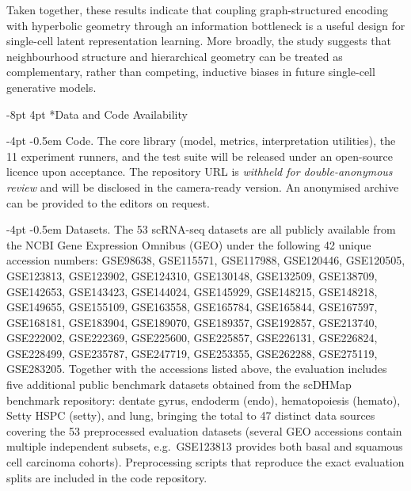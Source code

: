 \documentclass[preprint,12pt]{elsarticle}
\makeatletter
\renewcommand\section{\@startsection{section}{1}{\z@}%
  {-8pt \@plus -2pt \@minus -2pt}%
  {4pt \@plus 1pt \@minus 1pt}%
  {\normalfont\Large\bfseries}}
\renewcommand\paragraph{\@startsection{paragraph}{4}{\z@}%
  {-4pt \@plus -1pt \@minus -1pt}%
  {-0.5em}%
  {\normalfont\normalsize\bfseries}}
\makeatother
\begin{document}
Taken together, these results indicate that coupling graph-structured
encoding with hyperbolic geometry through an information bottleneck is
a useful design for single-cell latent representation learning. More
broadly, the study suggests that neighbourhood structure and
hierarchical geometry can be treated as complementary, rather than
competing, inductive biases in future single-cell generative models.


\section*{Data and Code Availability}

\paragraph{Code.}
The core library (model, metrics, interpretation utilities), the 11
experiment runners, and the test suite will be released under an
open-source licence upon acceptance. The repository URL is
\emph{withheld for double-anonymous review} and will be disclosed
in the camera-ready version. An anonymised archive can be provided
to the editors on request.

\paragraph{Datasets.}
The 53 scRNA-seq datasets are all publicly available from the NCBI
Gene Expression Omnibus (GEO) under the following 42 unique
accession numbers:
GSE98638, GSE115571, GSE117988, GSE120446, GSE120505, GSE123813,
GSE123902, GSE124310, GSE130148, GSE132509, GSE138709, GSE142653,
GSE143423, GSE144024, GSE145929, GSE148215, GSE148218, GSE149655,
GSE155109, GSE163558, GSE165784, GSE165844, GSE167597, GSE168181,
GSE183904, GSE189070, GSE189357, GSE192857, GSE213740, GSE222002,
GSE222369, GSE225600, GSE225857, GSE226131, GSE226824, GSE228499,
GSE235787, GSE247719, GSE253355, GSE262288, GSE275119, GSE283205.
Together with the accessions listed above, the evaluation includes
five additional public benchmark datasets obtained from the
scDHMap benchmark repository: dentate gyrus, endoderm (endo),
hematopoiesis (hemato), Setty HSPC (setty), and lung, bringing the
total to 47 distinct data sources covering the 53 preprocessed
evaluation datasets (several GEO accessions contain multiple
independent subsets, e.g.\ GSE123813 provides both basal and
squamous cell carcinoma cohorts).
Preprocessing scripts that reproduce the exact evaluation splits are
included in the code repository.
\end{document}
